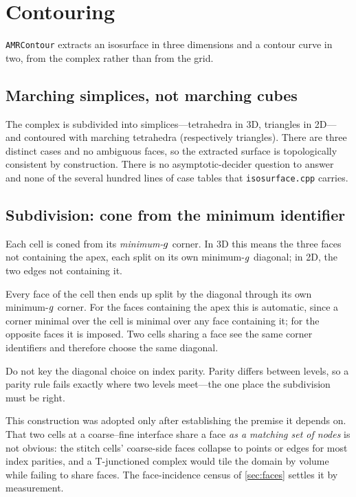 \chapter{Contouring}
\label{ch:contour}

\texttt{AMRContour} extracts an isosurface in three dimensions and a contour
curve in two, from the complex rather than from the grid.

\section{Marching simplices, not marching cubes}

The complex is subdivided into simplices---tetrahedra in 3D, triangles in
2D---and contoured with marching tetrahedra (respectively triangles). There are
three distinct cases and no ambiguous faces, so the extracted surface is
topologically consistent by construction. There is no asymptotic-decider
question to answer~\cite{chernyaev1995mc33} and none of the several hundred
lines of case tables that \texttt{isosurface.cpp} carries.

\section{Subdivision: cone from the minimum identifier}
\label{sec:cone}

Each cell is coned from its \emph{minimum-$g$} corner. In 3D this means the
three faces not containing the apex, each split on its own minimum-$g$
diagonal; in 2D, the two edges not containing it.

Every face of the cell then ends up split by the diagonal through its own
minimum-$g$ corner. For the faces containing the apex this is automatic,
since a corner minimal over the cell is minimal over any face containing it;
for the opposite faces it is imposed. Two cells sharing a face see the same
corner identifiers and therefore choose the same diagonal.

\begin{designrule}\label{rule:noparity}
Do not key the diagonal choice on index parity. Parity differs between levels,
so a parity rule fails exactly where two levels meet---the one place the
subdivision must be right.
\end{designrule}

This construction was adopted only after establishing the premise it depends
on. That two cells at a coarse--fine interface share a face \emph{as a matching
set of nodes} is not obvious: the stitch cells' coarse-side faces collapse to
points or edges for most index parities, and a T-junctioned complex would tile
the domain by volume while failing to share faces. The face-incidence census of
\cref{sec:faces} settles it by measurement.


